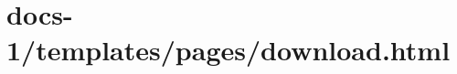 \usepackage[utf8]{inputenc}
\usepackage[T1]{fontenc}
\usepackage{imakeidx}
\usepackage{alphalph}
\usepackage{enumitem}
\makeindex[columns=3, title= ADempiere]



\tableofcontents

\section{docs-1/templates/pages/download.html}


\clearpage



